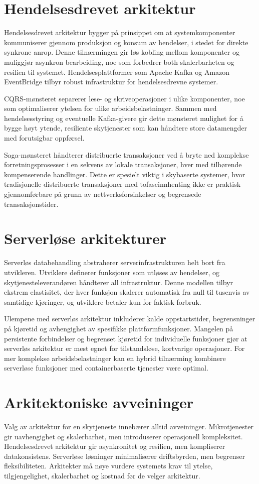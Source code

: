\documentclass[
    language=norsk,
    doctype=article,
]{../../omnilatex}
\begin{document}
\section{Hendelsesdrevet arkitektur}
Hendelsesdrevet arkitektur bygger på prinsippet om at systemkomponenter kommuniserer gjennom produksjon og konsum av hendelser, i stedet for direkte synkrone anrop. Denne tilnærmingen gir løs kobling mellom komponenter og muliggjør asynkron bearbeiding, noe som forbedrer both skalerbarheten og resilien til systemet. Hendelsesplattformer som Apache Kafka og Amazon EventBridge tilbyr robust infrastruktur for hendelsesdrevne systemer.

CQRS-mønsteret separerer lese- og skriveoperasjoner i ulike komponenter, noe som optimaliserer ytelsen for ulike arbeidsbelastninger. Sammen med hendelsesstyring og eventuelle Kafka-givere gir dette mønsteret mulighet for å bygge høyt ytende, resiliente skytjenester som kan håndtere store datamengder med forutsigbar oppførsel.

Saga-mønsteret håndterer distribuerte transaksjoner ved å bryte ned komplekse forretningsprosesser i en sekvens av lokale transaksjoner, hver med tilhørende kompenserende handlinger. Dette er spesielt viktig i skybaserte systemer, hvor tradisjonelle distribuerte transaksjoner med tofaseinnhenting ikke er praktisk gjennomførbare på grunn av nettverksforsinkelser og begrensede transaksjonstider.

\section{Serverløse arkitekturer}
Serverløs databehandling abstraherer serverinfrastrukturen helt bort fra utvikleren. Utviklere definerer funksjoner som utløses av hendelser, og skytjenesteleverandøren håndterer all infrastruktur. Denne modellen tilbyr ekstrem elastisitet, der hver funksjon skalerer automatisk fra null til tusenvis av samtidige kjøringer, og utviklere betaler kun for faktisk forbruk.

Ulempene med serverløs arkitektur inkluderer kalde oppstartstider, begrensninger på kjøretid og avhengighet av spesifikke plattformfunksjoner. Mangelen på persistente forbindelser og begrenset kjøretid for individuelle funksjoner gjør at serverløs arkitektur er mest egnet for tilstandsløse, kortvarige operasjoner. For mer komplekse arbeidsbelastninger kan en hybrid tilnærming kombinere serverløse funksjoner med containerbaserte tjenester være optimal.

\section{Arkitektoniske avveininger}
Valg av arkitektur for en skytjeneste innebærer alltid avveininger. Mikrotjenester gir uavhengighet og skalerbarhet, men introduserer operasjonell kompleksitet. Hendelsesdrevet arkitektur gir asynkronitet og resilien, men kompliserer datakonsistens. Serverløse løsninger minimaliserer driftsbyrden, men begrenser fleksibiliteten. Arkitekter må nøye vurdere systemets krav til ytelse, tilgjengelighet, skalerbarhet og kostnad før de velger arkitektur.
\end{document}
